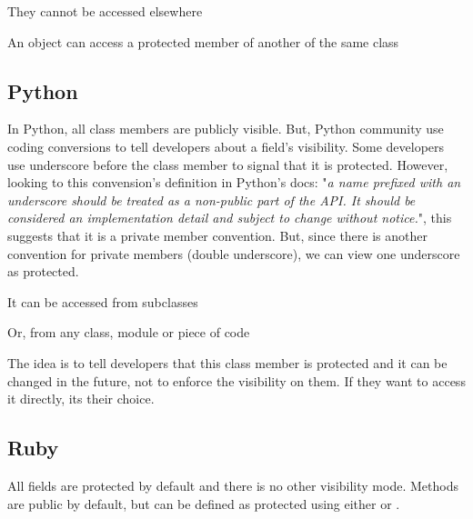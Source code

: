 \documentclass{KodeBook}
\begin{document}
They cannot be accessed elsewhere



An object can access a protected member of another of the same class



\subsection{Python}

In Python, all class members are publicly visible. 
But, Python community use coding conversions to tell developers about a field's visibility. 
Some developers use underscore \keyword{\_} before the class member to signal that it is protected. 
However, looking to this convension's definition in Python's docs: "\textit{a name prefixed with an underscore should be treated as a non-public part of the API. It should be considered an implementation detail and subject to change without notice.}", this suggests that it is a private member convention.
But, since there is another convention for private members (double underscore), we can view one underscore as protected.



It can be accessed from subclasses



Or, from any class, module or piece of code 



The idea is to tell developers that this class member is protected and it can be changed in the future, not to enforce the visibility on them. 
If they want to access it directly, its their choice.

\subsection{Ruby}

All fields are protected by default and there is no other visibility mode. 
Methods are public by default, but can be defined as protected using either  or . 
\end{document}
